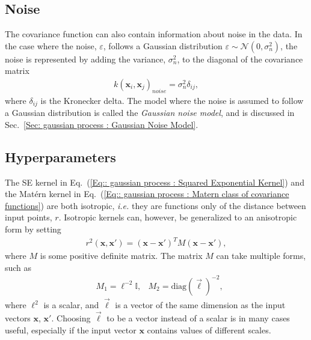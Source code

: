 \documentclass[twoside,english]{uiofysmaster}
\begin{document}
{\subsection{Noise}\label{Sec:: gaussian process : Noise Covariance Function}


The covariance function can also contain information about noise in the data. In the case where the noise, $\varepsilon$, follows a Gaussian distribution $\varepsilon \sim \mathcal{N}(0, \sigma_n^2)$, the noise is represented by adding the variance, $\sigma_n^2$, to the diagonal of the covariance matrix
\begin{align}
k(\textbf{x}_i, \textbf{x}_j)_{noise} = \sigma^2_n \delta_{ij},
\end{align}
where $\delta_{ij}$ is the Kronecker delta. The model where the noise is assumed to follow a Gaussian distribution is called the \textit{Gaussian noise model}, and is discussed in Sec.~\ref{Sec: gaussian process : Gaussian Noise Model}. %

\subsection{Hyperparameters}\label{Sec:: gaussian process : Hyperparameters}

The SE kernel in Eq.~(\ref{Eq:: gaussian process : Squared Exponential Kernel}) and the Mat\'{e}rn kernel in Eq.~(\ref{Eq:: gaussian process : Matern class of covariance functions}) are both isotropic, \textit{i.e.} they are functions only of the distance between input points, $r$. Isotropic kernels can, however, be generalized to an anisotropic form by setting
\begin{align}
r^2(\textbf{x}, \textbf{x}') = (\textbf{x} - \textbf{x}')^T M(\textbf{x} - \textbf{x}'),
\end{align}
where $M$ is some positive definite matrix. The matrix $M$ can take multiple forms, such as 
\begin{align}
&M_1 = \ell^{-2} \mathbb{I} , &M_2 = \text{diag}(\vec{\ell})^{-2},
\end{align}
where $\ell^2$ is a scalar, and $\vec{\ell}$ is a vector of the same dimension as the input vectors $\textbf{x}$, $\textbf{x}'$. Choosing $\vec{\ell}$ to be a vector instead of a scalar is in many cases useful, especially if the input vector $\textbf{x}$ contains values of different scales.

}
\end{document}
